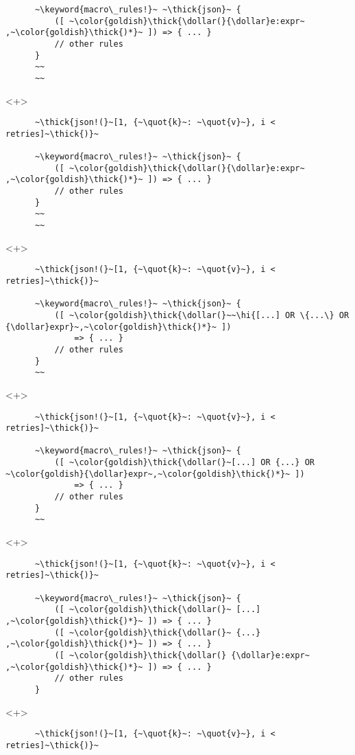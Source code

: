 \documentclass[usepdftitle=false]{beamer}
\newcommand{\dollar}{\makebox[\widthof{\$}][c]{\$}}
\newcommand{\thick}[1]{\contourlength{0.16pt}\contour[10]{black}{#1}}
\newcommand{\slantbox}[2][.5]
  {%
    \mbox
      {%
        \sbox{\foobox}{#2}%
        \hskip\wd\foobox
        \pdfsave
        \pdfsetmatrix{1 0 #1 1}%
        \llap{\usebox{\foobox}}%
        \pdfrestore
      }%
  }
\newcommand{\backslantbox}[2][.5]
  {%
    \mbox
      {%
        \sbox{\foobox}{#2}%
        \hskip\wd\foobox
        \pdfsave
        \pdfsetmatrix{-1 0 #1 1}%
        \llap{\usebox{\foobox}}%
        \pdfrestore
      }%
  }
\newcommand{\hi}[1]{%
\tikz[baseline=(A.base)]
 \node[highlighting=yellowbg,inner sep=0pt,text depth=0pt] (A) {#1};%
}
\newcommand{\openquote}{\backslantbox[.2]{\hspace{11pt}''\hspace{-11pt}}}
\newcommand{\closequote}{\slantbox[-.2]{\hspace{2pt}''\hspace{-2pt}}}
\newcommand{\blackquote}[1]{\openquote#1\closequote}
\newcommand{\quot}[1]{{\color{redish}\blackquote{#1}}}
\newcommand{\keyword}[1]{\color{greenish}#1}
\begin{document}
\begin{frame}[fragile]
\begin{onlyenv}
\begin{verbatim}
      ~\keyword{macro\_rules!}~ ~\thick{json}~ {
          ([ ~\color{goldish}\thick{\dollar(}{\dollar}e:expr~ ,~\color{goldish}\thick{)*}~ ]) => { ... }
          // other rules
      }
      ~~
      ~~
    \end{verbatim}
  \end{onlyenv}
  \begin{onlyenv}<+>
    \begin{verbatim}
      ~\thick{json!(}~[1, {~\quot{k}~: ~\quot{v}~}, i < retries]~\thick{)}~

      ~\keyword{macro\_rules!}~ ~\thick{json}~ {
          ([ ~\color{goldish}\thick{\dollar(}{\dollar}e:expr~ ,~\color{goldish}\thick{)*}~ ]) => { ... }
          // other rules
      }
      ~~
      ~~
    \end{verbatim}
  \end{onlyenv}
  \begin{onlyenv}<+>
    \begin{verbatim}
      ~\thick{json!(}~[1, {~\quot{k}~: ~\quot{v}~}, i < retries]~\thick{)}~

      ~\keyword{macro\_rules!}~ ~\thick{json}~ {
          ([ ~\color{goldish}\thick{\dollar(}~~\hi{[...] OR \{...\} OR {\dollar}expr}~,~\color{goldish}\thick{)*}~ ])
              => { ... }
          // other rules
      }
      ~~
    \end{verbatim}
  \end{onlyenv}
  \begin{onlyenv}<+>
    \begin{verbatim}
      ~\thick{json!(}~[1, {~\quot{k}~: ~\quot{v}~}, i < retries]~\thick{)}~

      ~\keyword{macro\_rules!}~ ~\thick{json}~ {
          ([ ~\color{goldish}\thick{\dollar(}~[...] OR {...} OR ~\color{goldish}{\dollar}expr~,~\color{goldish}\thick{)*}~ ])
              => { ... }
          // other rules
      }
      ~~
    \end{verbatim}
  \end{onlyenv}
  \begin{onlyenv}<+>
    \begin{verbatim}
      ~\thick{json!(}~[1, {~\quot{k}~: ~\quot{v}~}, i < retries]~\thick{)}~

      ~\keyword{macro\_rules!}~ ~\thick{json}~ {
          ([ ~\color{goldish}\thick{\dollar(}~ [...] ,~\color{goldish}\thick{)*}~ ]) => { ... }
          ([ ~\color{goldish}\thick{\dollar(}~ {...} ,~\color{goldish}\thick{)*}~ ]) => { ... }
          ([ ~\color{goldish}\thick{\dollar(} {\dollar}e:expr~ ,~\color{goldish}\thick{)*}~ ]) => { ... }
          // other rules
      }
    \end{verbatim}
  \end{onlyenv}
  \begin{onlyenv}<+>
    \begin{verbatim}
      ~\thick{json!(}~[1, {~\quot{k}~: ~\quot{v}~}, i < retries]~\thick{)}~


\end{verbatim}
\end{onlyenv}
\end{frame}
\end{document}
